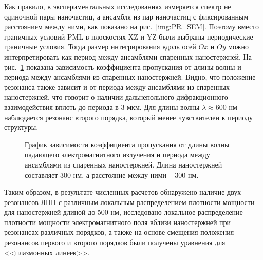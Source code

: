 Как правило, в экспериментальных исследованиях измеряется спектр не одиночной пары наночастиц, а ансамбля из пар наночастиц с фиксированным расстоянием между ними, как показано на рис.~\ref{img:PR_SEM}. Поэтому вместо граничных условий PML в плоскостях XZ и YZ были выбраны периодические граничные условия. Тогда размер интегрирования вдоль осей $ Ox $ и $ Oy $ можно интерпретировать как период между ансамблями спаренных наностержней. На рис.~\ref{img:BCperiod} показана зависимость коэффициента пропускания от длины волны и периода между ансамблями из спаренных наностержней. Видно, что положение резонанса также зависит и от периода между ансамблями из спаренных наностержней, что говорит о наличии дальнепольного дифракционного взаимодействия  вплоть до периода в 3 мкм. Для длины волны $ \lambda \approx 600$ нм наблюдается резонанс второго порядка, который менее чувствителен к периоду структуры.

\begin{figure}
\caption{График зависимости коэффициента пропускания от длины волны падающего электромагнитного излучения и периода между ансамблями из спаренных наностержней. Длина наностержней составляет 300 нм, а расстояние между ними -- 300 нм.}
\label{img:BCperiod}
\end{figure}

Таким образом, в результате численных расчетов  обнаружено наличие двух резонансов ЛПП  с различным локальным распределением плотности мощности для наностержней длиной до 500 нм, исследовано локальное распределение плотности мощности электромагнитного поля вблизи наностержней при резонансах различных порядков, а также на основе смещения положения резонансов первого и второго порядков были получены уравнения для <<плазмонных линеек>>.

